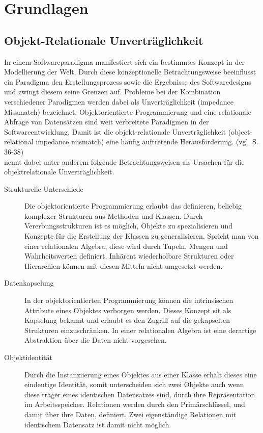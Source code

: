 \section{Grundlagen}
 
\subsection{Objekt-Relationale Unverträglichkeit}

In einem Softwareparadigma manifestiert sich ein bestimmtes Konzept in der Modellierung der Welt. Durch diese konzeptionelle Betrachtungsweise beeinflusst ein Paradigma den Erstellungsprozess sowie die Ergebnisse des Softwaredesigns und zwingt diesem seine Grenzen auf. Probleme bei der Kombination verschiedener Paradigmen werden dabei als Unverträglichkeit (impedance Missmatch) bezeichnet.
Objektorientierte Programmierung  und eine relationale Abfrage von Datensätzen sind weit verbreitete Paradigmen in der Softwareentwicklung. Damit ist die objekt-relationale Unverträglichkeit (object-relational impedance mismatch) eine häufig auftretende Herausforderung. (vgl. \cite{ireland2009classification} S. 36-38)\\

\cite{ireland2009classification} nennt dabei unter anderem folgende Betrachtungsweisen als Ursachen für die objektrelationale Unverträglichkeit.

\begin{description}
 \item [Strukturelle Unterschiede]  
 Die objektorientierte Programmierung erlaubt das definieren, beliebig komplexer Strukturen aus Methoden und Klassen. Durch Vererbungsstrukturen ist es möglich, Objekte zu spezialisieren und Konzepte für die Erstellung der Klassen zu generalisieren. Spricht man von einer relationalen Algebra, diese wird durch Tupeln, Mengen und Wahrheitswerten definiert. Inhärent wiederholbare Strukturen oder Hierarchien können mit diesen Mitteln nicht umgesetzt werden.   
 
 \item [Datenkapselung] 
 In der objektorientierten Programmierung können die intrinsischen Attribute eines Objektes verborgen werden. Dieses Konzept sit als Kapselung bekannt und erlaubt es den Zugriff auf die gekapselten Strukturen einzuschränken. In einer relationalen Algebra ist eine derartige Abstraktion über die Daten nicht vorgesehen.
 
 
 \item [Objektidentität]  
 Durch die Instanziierung eines Objektes aus einer Klasse erhält dieses eine eindeutige Identität, somit unterscheiden sich zwei Objekte auch wenn diese träger eines identischen Datensatzes sind, durch ihre Repräsentation im Arbeitsspeicher. Relationen werden durch den Primärschlüssel, und damit über ihre Daten, definiert. Zwei eigenständige Relationen mit identischem Datensatz ist damit nicht möglich.
\end{description}


